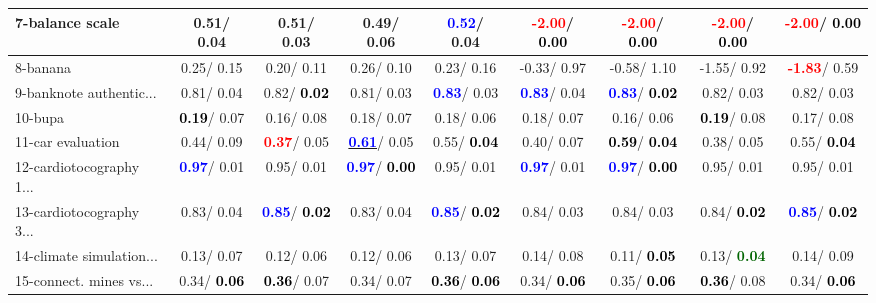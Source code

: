 \begin{table}[h]
\begin{center}
\begin{tabular}{lc|c|c|c|c|c|c|c}
7-balance scale &   0.51/  0.04 &   0.51/  0.03 &   0.49/  0.06 & \textcolor{blue}{\textbf{  0.52}}/  0.04 & \textcolor{red}{\textbf{ -2.00}}/\textcolor{black}{\textbf{  0.00}} & \textcolor{red}{\textbf{ -2.00}}/\textcolor{black}{\textbf{  0.00}} & \textcolor{red}{\textbf{ -2.00}}/\textcolor{black}{\textbf{  0.00}} & \textcolor{red}{\textbf{ -2.00}}/\textcolor{black}{\textbf{  0.00}} \\ \hline
8-banana &   0.25/  0.15 &   0.20/  0.11 &   0.26/  0.10 &   0.23/  0.16 &  -0.33/  0.97 &  -0.58/  1.10 &  -1.55/  0.92 & \textcolor{red}{\textbf{ -1.83}}/  0.59 \\
9-banknote authentic... &   0.81/  0.04 &   0.82/\textcolor{black}{\textbf{  0.02}} &   0.81/  0.03 & \textcolor{blue}{\textbf{  0.83}}/  0.03 & \textcolor{blue}{\textbf{  0.83}}/  0.04 & \textcolor{blue}{\textbf{  0.83}}/\textcolor{black}{\textbf{  0.02}} &   0.82/  0.03 &   0.82/  0.03 \\
10-bupa & \textcolor{black}{\textbf{  0.19}}/  0.07 &   0.16/  0.08 &   0.18/  0.07 &   0.18/  0.06 &   0.18/  0.07 &   0.16/  0.06 & \textcolor{black}{\textbf{  0.19}}/  0.08 &   0.17/  0.08 \\
11-car evaluation &   0.44/  0.09 & \textcolor{red}{\textbf{  0.37}}/  0.05 & \underline{\textcolor{blue}{\textbf{  0.61}}}/  0.05 &   0.55/\textcolor{black}{\textbf{  0.04}} &   0.40/  0.07 & \textcolor{black}{\textbf{  0.59}}/\textcolor{black}{\textbf{  0.04}} &   0.38/  0.05 &   0.55/\textcolor{black}{\textbf{  0.04}} \\
12-cardiotocography 1... & \textcolor{blue}{\textbf{  0.97}}/  0.01 &   0.95/  0.01 & \textcolor{blue}{\textbf{  0.97}}/\textcolor{black}{\textbf{  0.00}} &   0.95/  0.01 & \textcolor{blue}{\textbf{  0.97}}/  0.01 & \textcolor{blue}{\textbf{  0.97}}/\textcolor{black}{\textbf{  0.00}} &   0.95/  0.01 &   0.95/  0.01 \\
13-cardiotocography 3... &   0.83/  0.04 & \textcolor{blue}{\textbf{  0.85}}/\textcolor{black}{\textbf{  0.02}} &   0.83/  0.04 & \textcolor{blue}{\textbf{  0.85}}/\textcolor{black}{\textbf{  0.02}} &   0.84/  0.03 &   0.84/  0.03 &   0.84/\textcolor{black}{\textbf{  0.02}} & \textcolor{blue}{\textbf{  0.85}}/\textcolor{black}{\textbf{  0.02}} \\
14-climate simulation... &   0.13/  0.07 &   0.12/  0.06 &   0.12/  0.06 &   0.13/  0.07 &   0.14/  0.08 &   0.11/\textcolor{black}{\textbf{  0.05}} &   0.13/\textcolor{darkgreen}{\textbf{  0.04}} &   0.14/  0.09 \\ \hline
15-connect. mines vs... &   0.34/\textcolor{black}{\textbf{  0.06}} & \textcolor{black}{\textbf{  0.36}}/  0.07 &   0.34/  0.07 & \textcolor{black}{\textbf{  0.36}}/\textcolor{black}{\textbf{  0.06}} &   0.34/\textcolor{black}{\textbf{  0.06}} &   0.35/\textcolor{black}{\textbf{  0.06}} & \textcolor{black}{\textbf{  0.36}}/  0.08 &   0.34/\textcolor{black}{\textbf{  0.06}} \\

\end{tabular}
\end{center}
\end{table}
